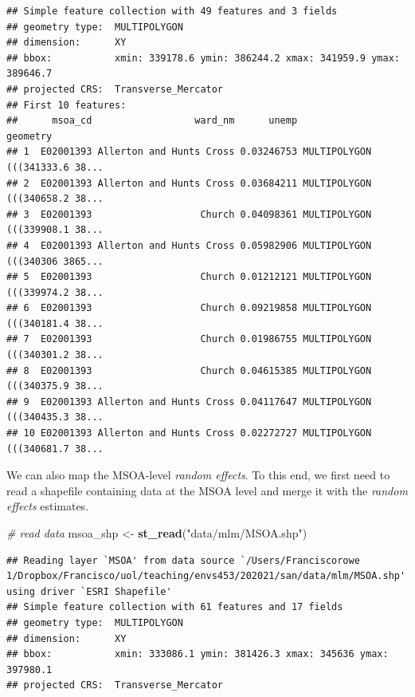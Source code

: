 \documentclass[
]{book}
\newenvironment{Shaded}{\begin{snugshade}}{\end{snugshade}}
\newcommand{\CommentTok}[1]{\textcolor[rgb]{0.56,0.35,0.01}{\textit{#1}}}
\newcommand{\KeywordTok}[1]{\textcolor[rgb]{0.13,0.29,0.53}{\textbf{#1}}}
\newcommand{\NormalTok}[1]{#1}
\newcommand{\OperatorTok}[1]{\textcolor[rgb]{0.81,0.36,0.00}{\textbf{#1}}}
\newcommand{\StringTok}[1]{\textcolor[rgb]{0.31,0.60,0.02}{#1}}
\begin{document}
\begin{verbatim}
## Simple feature collection with 49 features and 3 fields
## geometry type:  MULTIPOLYGON
## dimension:      XY
## bbox:           xmin: 339178.6 ymin: 386244.2 xmax: 341959.9 ymax: 389646.7
## projected CRS:  Transverse_Mercator
## First 10 features:
##      msoa_cd                  ward_nm      unemp                       geometry
## 1  E02001393 Allerton and Hunts Cross 0.03246753 MULTIPOLYGON (((341333.6 38...
## 2  E02001393 Allerton and Hunts Cross 0.03684211 MULTIPOLYGON (((340658.2 38...
## 3  E02001393                   Church 0.04098361 MULTIPOLYGON (((339908.1 38...
## 4  E02001393 Allerton and Hunts Cross 0.05982906 MULTIPOLYGON (((340306 3865...
## 5  E02001393                   Church 0.01212121 MULTIPOLYGON (((339974.2 38...
## 6  E02001393                   Church 0.09219858 MULTIPOLYGON (((340181.4 38...
## 7  E02001393                   Church 0.01986755 MULTIPOLYGON (((340301.2 38...
## 8  E02001393                   Church 0.04615385 MULTIPOLYGON (((340375.9 38...
## 9  E02001393 Allerton and Hunts Cross 0.04117647 MULTIPOLYGON (((340435.3 38...
## 10 E02001393 Allerton and Hunts Cross 0.02272727 MULTIPOLYGON (((340681.7 38...
\end{verbatim}

We can also map the MSOA-level \emph{random effects}. To this end, we first need to read a shapefile containing data at the MSOA level and merge it with the \emph{random effects} estimates.

\begin{Shaded}
\begin{Highlighting}[]
\CommentTok{# read data}
\NormalTok{msoa_shp <-}\StringTok{ }\KeywordTok{st_read}\NormalTok{(}\StringTok{"data/mlm/MSOA.shp"}\NormalTok{)}
\end{Highlighting}
\end{Shaded}

\begin{verbatim}
## Reading layer `MSOA' from data source `/Users/Franciscorowe 1/Dropbox/Francisco/uol/teaching/envs453/202021/san/data/mlm/MSOA.shp' using driver `ESRI Shapefile'
## Simple feature collection with 61 features and 17 fields
## geometry type:  MULTIPOLYGON
## dimension:      XY
## bbox:           xmin: 333086.1 ymin: 381426.3 xmax: 345636 ymax: 397980.1
## projected CRS:  Transverse_Mercator
\end{verbatim}

\begin{Shaded}
\end{Shaded}
\end{document}
